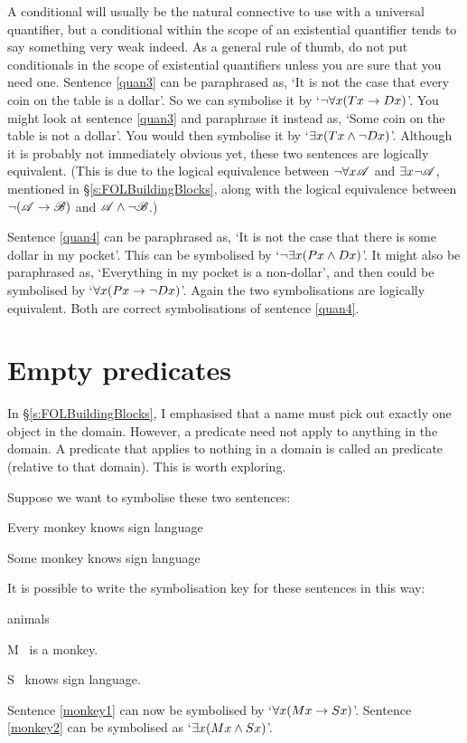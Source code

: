 A conditional will usually be the natural connective to use with a universal quantifier, but a conditional within the scope of an existential quantifier tends to say something very weak indeed. As a general rule of thumb, do not put conditionals in the scope of existential quantifiers unless you are sure that you need one.
Sentence \ref{quan3} can be paraphrased as, `It is not the case that every coin on the table is a dollar'. So we can symbolise it by `$\neg \forall x(Tx \rightarrow Dx)$'. You might look at sentence \ref{quan3} and paraphrase it instead as, `Some coin on the table is not a dollar'. You would then symbolise it by `$\exists x(Tx \wedge \neg Dx)$'. Although it is probably not immediately obvious yet, these two sentences are logically equivalent. (This is due to the logical equivalence between $\neg\forall x\mathscr{A}$ and $\exists x\neg\mathscr{A}$, mentioned in §\ref{s:FOLBuildingBlocks}, along with the logical equivalence between $\neg(\mathscr{A}\rightarrow\mathscr{B})$ and $\mathscr{A}\wedge\neg\mathscr{B}$.)

Sentence \ref{quan4} can be paraphrased as, `It is not the case that there is some dollar in my pocket'. This can be symbolised by `$\neg\exists x(Px \wedge Dx)$'. It might also be paraphrased as, `Everything in my pocket is a non-dollar', and then could be symbolised by `$\forall x(Px \rightarrow \neg Dx)$'. Again the two symbolisations are logically equivalent. Both are correct symbolisations of sentence \ref{quan4}.


\section{Empty predicates}
In §\ref{s:FOLBuildingBlocks}, I emphasised that a name must pick out exactly one object in the domain. However, a predicate need not apply to anything in the domain. A predicate that applies to nothing in a domain is called an  predicate (relative to that domain). This is worth exploring.

Suppose we want to symbolise these two sentences:
	\begin{earg}
		\item[\ex{monkey1}] Every monkey knows sign language
		\item[\ex{monkey2}] Some monkey knows sign language
	\end{earg}
It is possible to write the symbolisation key for these sentences in this way:
	\begin{ekey}
		\item[\text{domain}] animals
		\item[M] \blank\ is a monkey.
		\item[S] \blank\ knows sign language.
	\end{ekey}
Sentence \ref{monkey1} can now be symbolised by `$\forall x(Mx \rightarrow Sx)$'. Sentence \ref{monkey2} can be symbolised as `$\exists x(Mx \wedge Sx)$'.

